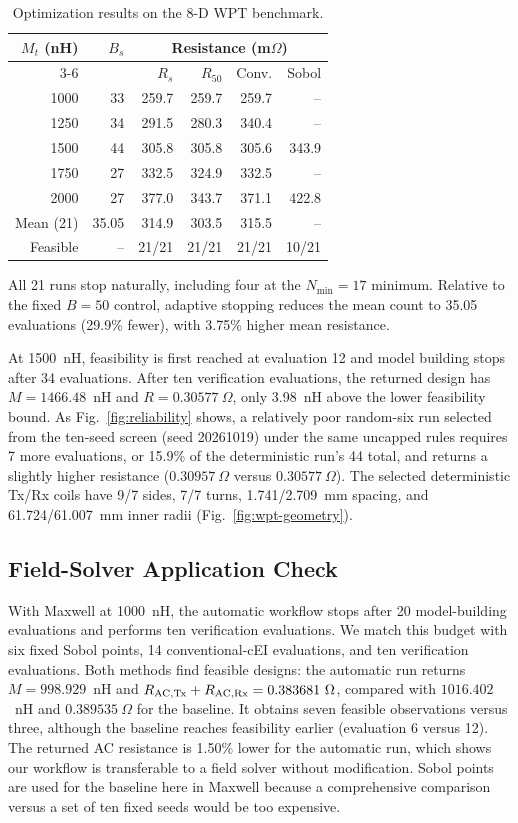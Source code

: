 \documentclass[10pt,conference,letterpaper]{IEEEtran}
\begin{document}
\begin{table}[!t]
\caption{Optimization results on the 8-D WPT benchmark.}
\label{tab:wpt}
\centering
\footnotesize
\begin{tabular}{@{}rrrrrr@{}}
\toprule
$M_t$ (nH) & $B_s$ & \multicolumn{4}{c}{Resistance (m$\Omega$)} \\
\cmidrule(lr){3-6}
& & $R_s$ & $R_{50}$ & Conv. & Sobol \\
\midrule
1000 & 33 & 259.7 & 259.7 & 259.7 & -- \\
1250 & 34 & 291.5 & 280.3 & 340.4 & -- \\
1500 & 44 & 305.8 & 305.8 & 305.6 & 343.9 \\
1750 & 27 & 332.5 & 324.9 & 332.5 & -- \\
2000 & 27 & 377.0 & 343.7 & 371.1 & 422.8 \\
\midrule
Mean (21) & 35.05 & 314.9 & 303.5 & 315.5 & -- \\
Feasible & -- & 21/21 & 21/21 & 21/21 & 10/21 \\
\bottomrule
\end{tabular}
\end{table}

All 21 runs stop naturally, including four at the $N_{\min}=17$ minimum. Relative to the fixed $B=50$ control, adaptive stopping reduces the mean count to 35.05 evaluations (29.9\% fewer), with 3.75\% higher mean resistance.

At 1500~nH, feasibility is first reached at evaluation 12 and model building stops after 34 evaluations. After ten verification evaluations, the returned design has $M=1466.48$~nH and $R=0.30577~\Omega$, only 3.98~nH above the lower feasibility bound. As Fig.~\ref{fig:reliability} shows, a relatively poor random-six run selected from the ten-seed screen (seed 20261019) under the same uncapped rules requires 7 more evaluations, or 15.9\% of the deterministic run's 44 total, and returns a slightly higher resistance ($0.30957~\Omega$ versus $0.30577~\Omega$). The selected deterministic Tx/Rx coils have 9/7 sides, 7/7 turns, 1.741/2.709~mm spacing, and 61.724/61.007~mm inner radii (Fig.~\ref{fig:wpt-geometry}).

\subsection{Field-Solver Application Check}
With Maxwell at 1000~nH, the automatic workflow stops after 20 model-building evaluations and performs ten verification evaluations. We match this budget with six fixed Sobol points, 14 conventional-cEI evaluations, and ten verification evaluations. Both methods find feasible designs: the automatic run returns $M=998.929$~nH and $R_{\rm AC,Tx}+R_{\rm AC,Rx}=0.383681~\Omega$, compared with $1016.402$~nH and $0.389535~\Omega$ for the baseline. It obtains seven feasible observations versus three, although the baseline reaches feasibility earlier (evaluation 6 versus 12). The returned AC resistance is 1.50\% lower for the automatic run, which shows our workflow is transferable to a field solver without modification. Sobol points are used for the baseline here in Maxwell because a comprehensive comparison versus a set of ten fixed seeds would be too expensive.
\end{document}
